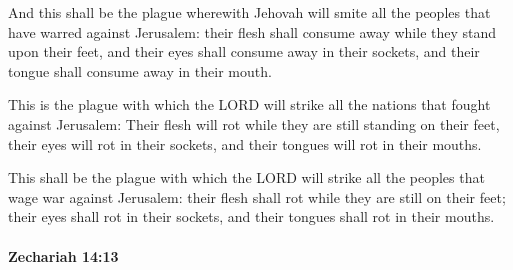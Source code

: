 			\begin{versebox}
					\item[BHS] 
					\item[LXX] 
					\item[ASV] And this shall be the plague wherewith Jehovah will smite all the peoples that have warred against Jerusalem: their flesh shall consume away while they stand upon their feet, and their eyes shall consume away in their sockets, and their tongue shall consume away in their mouth.
					\item[NIV] This is the plague with which the LORD will strike all the nations that fought against Jerusalem: Their flesh will rot while they are still standing on their feet, their eyes will rot in their sockets, and their tongues will rot in their mouths.
					\item[NRSV] This shall be the plague with which the LORD will strike all the peoples that wage war against Jerusalem: their flesh shall rot while they are still on their feet; their eyes shall rot in their sockets, and their tongues shall rot in their mouths.
			\end{versebox}

		\paragraph{Zechariah 14:13} %
			\label{ZECHARIAH-14-13}

